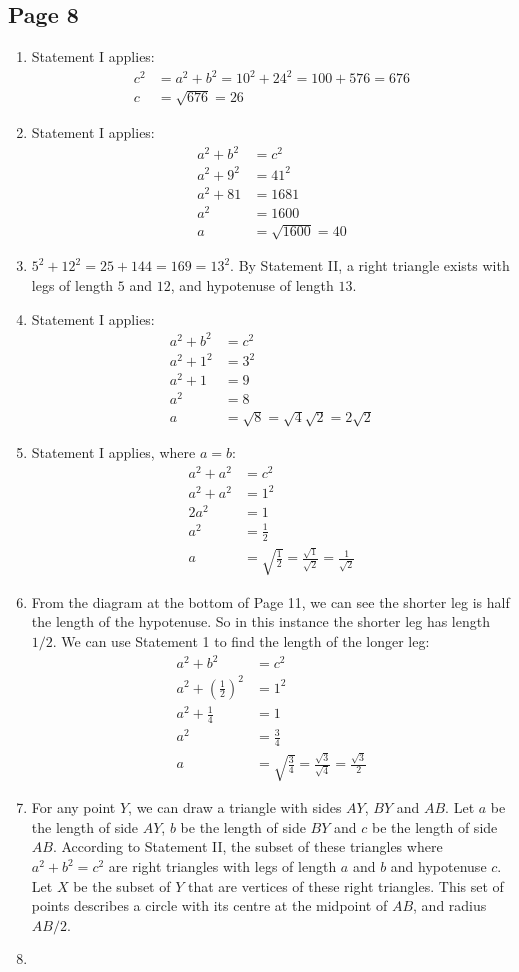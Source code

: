 \documentclass{article}
\newenvironment{solutions}[1]
{\subsection*{#1}
 \begin{enumerate}[leftmargin=1.5em]}
{\end{enumerate}}
\newcommand{\solution}{\item}
\begin{document}
\begin{solutions}{Page 8}
\solution %
Statement I applies:
\begin{align*}
c^2 &= a^2 + b^2 = 10^2 + 24^2 = 100 + 576 = 676\\
c   &= \sqrt{676} = 26
\end{align*}

\solution %
Statement I applies:
\begin{align*}
a^2 + b^2 &= c^2\\
a^2 + 9^2 &= 41^2\\
a^2 + 81 &= 1681\\
a^2 &= 1600\\
a &= \sqrt{1600} = 40
\end{align*}

\solution %
$5^2 + 12^2 = 25 + 144 = 169 = 13^2$. By Statement II, a right triangle exists with legs of length $5$ and $12$, and hypotenuse of length $13$.  

\solution %
Statement I applies:
\begin{align*}
a^2 + b^2 &= c^2\\
a^2 + 1^2 &= 3^2\\
a^2 + 1 &= 9\\
a^2 &= 8\\
a &= \sqrt{8} = \sqrt{4}\sqrt{2} = 2\sqrt{2}
\end{align*}

\solution %
Statement I applies, where $a=b$:
\begin{align*}
a^2 + a^2 &= c^2\\
a^2 + a^2 &= 1^2\\
2a^2 &= 1\\
a^2 &= \frac{1}{2}\\
a &= \sqrt{\frac{1}{2}} = \frac{\sqrt{1}}{\sqrt{2}} = \frac{1}{\sqrt{2}}
\end{align*}

\solution %
From the diagram at the bottom of Page 11, we can see the shorter leg is half the length of the hypotenuse.
So in this instance the shorter leg has length $1/2$. We can use Statement 1 to find the length of the longer leg:
\begin{align*}
a^2 + b^2 &= c^2\\
a^2 + \left(\frac{1}{2}\right)^2 &= 1^2\\
a^2 + \frac{1}{4} &= 1\\
a^2 &= \frac{3}{4}\\
a &= \sqrt{\frac{3}{4}} = \frac{\sqrt{3}}{\sqrt{4}} = \frac{\sqrt{3}}{2}
\end{align*}

\solution %
For any point $Y$, we can draw a triangle with sides $AY$, $BY$ and $AB$.
Let $a$ be the length of side $AY$, $b$ be the length of side $BY$ and $c$ be the length of side $AB$.
According to Statement II, the subset of these triangles where $a^2 + b^2 = c^2$ are right triangles with legs of length $a$ and $b$ and hypotenuse $c$.
Let $X$ be the subset of $Y$ that are vertices of these right triangles.
This set of points describes a circle with its centre at the midpoint of $AB$, and radius $AB/2$.

\solution %

\end{solutions}
\end{document}
